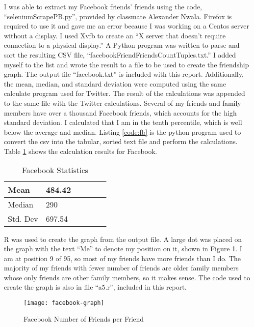 \documentclass[paper=a4, fontsize=11pt]{scrartcl} %
\numberwithin{equation}{section} %
\numberwithin{figure}{section} %
\numberwithin{table}{section} %
\begin{document}
I was able to extract my Facebook friends' friends using the code, ``seleniumScrapePB.py'',  provided by classmate Alexander Nwala. 
Firefox is required to use it and gave me an error because I was working on a Centos server without a display.
I used Xvfb to create an ``X server that doesn't require connection to a physical display.''\cite{bib:firefox}
A Python program was written to parse and sort the resulting CSV file, ``facebookFriendFriendsCountTuples.txt.'' \cite{bib:csv}
I added myself to the list and wrote the result to a file to be used to create the friendship graph.
The output file ``facebook.txt'' is included with this report.
Additionally, the mean, median, and standard deviation were computed using the same calculate program used for Twitter.
The result of the calculations was appended to the same file with the Twitter calculations.
Several of my friends and family members have over a thousand Facebook friends, which accounts for the high standard deviation.
I calculated that I am in the tenth percentile, which is well below the average and median.
Listing \ref{code:fb} is the python program used to convert the csv into the tabular, sorted text file and perform the calculations.
Table \ref{table:fb-calc} shows the calculation results for Facebook.

\begin{table}[H]
\centering
\begin{tabular}{|l|l|l|l|l|l|}
\hline
Mean & 484.42 \\
\hline
Median &  290 \\
\hline
Std. Dev & 697.54 \\
\hline
\end{tabular}
\caption{Facebook Statistics}
\label{table:fb-calc}
\end{table}

R was used to create the graph from the output file.
A large dot was placed on the graph with the text ``Me'' to denote my position on it, shown in Figure \ref{fig:facebook}.\cite{bib:rline}
I am at position 9 of 95, so most of my friends have more friends than I do.  
The majority of my friends with fewer number of friends are older family members whose only friends are other family members, so it makes sense.
The code used to create the graph is also in file ``a5.r'', included in this report.

\begin{figure}[H]
\texttt{[image: facebook-graph]}
\caption{Facebook Number of Friends per Friend}
\label{fig:facebook}
\end{figure}
\end{document}
